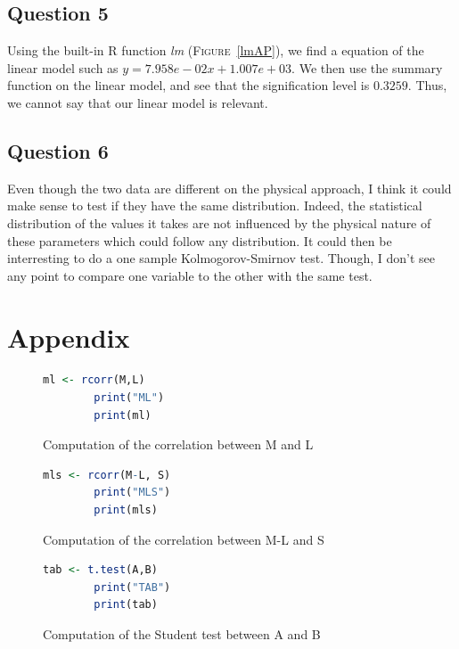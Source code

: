 \documentclass[12pt,a4paper]{article}
\begin{document}
\subsection*{Question 5}
Using the built-in R function \textit{lm} (\textsc{Figure}~\ref{lmAP}), we find a equation of the linear model such as $y = 7.958e-02x + 1.007e+03$. We then use the summary function on the linear model, and see that the signification level is $0.3259$. Thus, we cannot say that our linear model is relevant.

\subsection*{Question 6}
Even though the two data are different on the physical approach, I think it could make sense to test if they have the same distribution. Indeed, the statistical distribution of the values it takes are not influenced by the physical nature of these parameters which could follow any distribution. It could then be interresting to do a one sample Kolmogorov-Smirnov test. Though, I don't see any point to compare one variable to the other with the same test.
~\\

\newpage
\section*{Appendix}
\begin{figure}[ht]
    \begin{lstlisting}[language=R]
        ml <- rcorr(M,L)
        print("ML")
        print(ml)
    \end{lstlisting}
    \caption{Computation of the correlation between M and L}
    \label{corML}
\end{figure}

\begin{figure}[ht]
    \begin{lstlisting}[language=R]
        mls <- rcorr(M-L, S)
        print("MLS")
        print(mls)
    \end{lstlisting}
    \caption{Computation of the correlation between M-L and S}
    \label{corMLS}
\end{figure}

\begin{figure}[ht]
    \begin{lstlisting}[language=R]
        tab <- t.test(A,B)
        print("TAB")
        print(tab)
    \end{lstlisting}
    \caption{Computation of the Student test between A and B}
    \label{ttestAB}
\end{figure}
\end{document}

